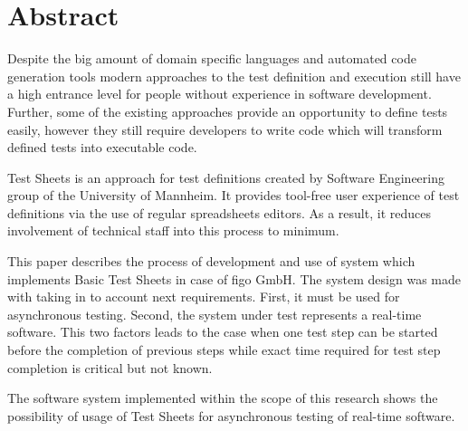\chapter{Abstract}
\label{chap:abstract}
Despite the big amount of domain specific languages and automated code generation tools modern approaches to the test definition and execution still have a high entrance level for people without experience in software development. Further, some of the existing approaches provide an opportunity to define tests easily, however they still require developers to write code which will transform defined tests into executable code. 

Test Sheets is an approach for test definitions created by Software Engineering group of the University of Mannheim. It provides  tool-free user experience of test definitions via the use of regular spreadsheets editors.
As a result, it reduces involvement of technical staff into this process to minimum.

This paper describes the process of development and use of system which implements Basic Test Sheets in case of figo GmbH. The system design was made with taking in to account next requirements. First, it must be used for asynchronous testing. Second, the system under test represents a real-time software. This two factors leads to the case when one test step can be started before the completion of previous steps while exact time required for test step completion is critical but not known.

The software system implemented within the scope of this research shows the possibility of usage of Test Sheets for asynchronous testing of real-time software.

